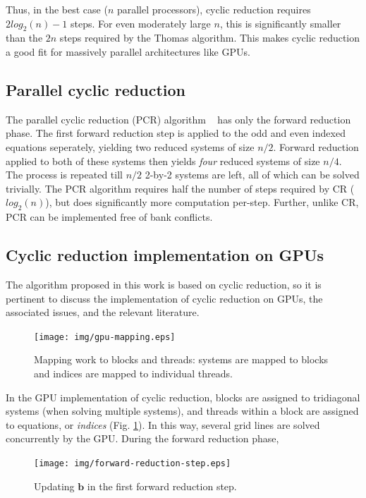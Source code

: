 Thus, in the best case ($n$ parallel processors),
cyclic reduction requires 
$2log_2(n) - 1$ steps.
For even moderately large $n$,
this is significantly smaller than
the $2n$ steps required by the Thomas algorithm.
This makes cyclic reduction a good fit
for massively parallel architectures like GPUs.

\subsection{Parallel cyclic reduction}

The parallel cyclic reduction (PCR) algorithm ~\cite{Zhang2010FTS}
has only the forward reduction phase.
The first forward reduction step is applied to
the odd and even indexed equations seperately,
yielding two reduced systems
of size $n/2$.
Forward reduction applied to both of these
systems then yields \emph{four} reduced
systems of size $n/4$.
The process is repeated till
$n/2$ 2-by-2 systems are left,
all of which can be solved trivially.
The PCR algorithm requires half the number of steps
required by CR ($log_2(n)$),
but does significantly more computation per-step.
Further, unlike CR,
PCR can be implemented free of bank conflicts.

\subsection{Cyclic reduction implementation on GPUs}

The algorithm proposed in this work is based on cyclic reduction,
so it is pertinent to discuss the
implementation of cyclic reduction on GPUs,
the associated issues,
and the relevant literature.

\begin{figure}
\begin{center}
\texttt{[image: img/gpu-mapping.eps]}
\end{center}
\caption{Mapping work to blocks and threads:
systems are mapped to blocks and
indices are mapped to individual threads.}
\label{fig:gpu-mapping}
\end{figure}

In the GPU implementation of cyclic reduction,
blocks are assigned to tridiagonal systems
(when solving multiple systems),
and threads within a block 
are assigned to equations, or \emph{indices}
(Fig. \ref{fig:gpu-mapping}).
In this way, several grid lines are solved concurrently
by the GPU.
During the forward reduction phase,

\begin{figure}
\begin{center}
\texttt{[image: img/forward-reduction-step.eps]}
\end{center}
\caption{Updating $\bm{b}$ in the first forward reduction step.}
\label{fig:forward-reduction-step}
\end{figure}

